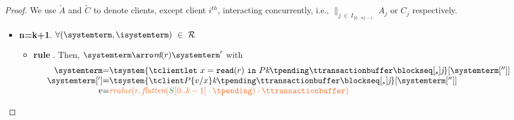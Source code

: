 \begin{proof}
 We use $\tilde{A}$ and $\tilde{C}$ to denote clients, except client $i^{th}$, interacting concurrently, i.e., $\parallel_{j \ \in\ I_{\{0 \ldots n\} - i}}$ $A_j$ or $C_j$ respectively.

\begin{itemize}
   
	
   \item{\bf n=k+1}. $\forall (\systemterm ,\isystemterm ) \ \in \ \mathcal{R}$
   
		
			
			\begin{itemize}
				\item {\bf rule }. Then, $\systemterm  \arroi{\readtran{r}} \systemterm '$ with 
				\[\begin{array}{r@{=}l}
					\systemterm & \tsystem{\tclienti{\treadins{x}{r}}{\tknown}{\tpending}{\ttransactionbuffer}{\tsent}{\treceivebuffer}}[{\systemterm['']}]
					\\
					\systemterm['] & \tsystem{\tclienti{{\tprogram}\subst{x}{v}}{\tknown}{\tpending}{\ttransactionbuffer}{\tsent}{\treceivebuffer}}[{\systemterm['']}]	
					\\
					v &  \rvalue{r}{\flatten {\queuemessage[0..\tknown-1] \cdot \tpending} \cdot \ttransactionbuffer}	
				  \end{array}
				\]
		

\end{itemize}
\end{itemize}
\end{proof}
